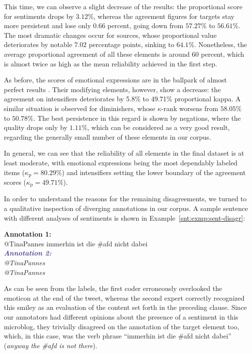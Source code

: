 This time, we can observe a slight decrease of the results: the
proportional score for sentiments drops by $3.12\%$, whereas the
agreement figures for targets stay more persistent and lose only 0.66
percent, going down from $57.27\%$ to $56.61\%$.  The most dramatic
changes occur for sources, whose proportional value deteriorates by
notable $7.02$ percentage points, sinking to $64.1\%$.  Nonetheless,
the average proportional agreement of all these elements is around 60
percent, which is almost twice as high as the mean reliability
achieved in the first step.

As before, the scores of emotional expressions are in the ballpark of
almost perfect results \cite[cf.][]{Landis:77}.  Their modifying
elements, however, show a decrease: the agreement on intensifiers
deteriorates by 5.8\% to 49.71\% proportional kappa.  A similar
situation is observed for diminishers, whose $\kappa$-rank worsens
from $58.05\%$ to $50.78\%$.  The best persistence in this regard is
shown by negations, where the quality drops only by $1.11\%$, which
can be considered as a very good result, regarding the generally small
number of these elements in our corpus.

In general, we can see that the reliability of all elements in the
final dataset is at least moderate, with emotional expressions being
the most dependably labeled items ($\kappa_{\textrm{p}}=80.29\%$) and
intensifiers setting the lower boundary of the agreement scores
($\kappa_{\textrm{p}}=49.71\%$).

In order to understand the reasons for the remaining disagreements, we
turned to a qualitative inspection of diverging annotations in our
corpus.  A sample sentence with different analyses of sentiments is
shown in Example~\ref{snt:exmp:sent-disagr}:
\begin{example}\label{snt:exmp:sent-disagr}
  \textcolor{red3}{\textbf{Annotation 1:}}\\ \upshape{}@TinaPannes
  immerhin ist die \#afd nicht dabei \smiley{}\\[0.8em]\itshape
  \noindent\textcolor{darkslateblue}{\textbf{\itshape Annotation
      2:}}\\ \upshape{}@TinaPannes
  \\[0.8em]
  \noindent\itshape{}@TinaPannes
  \upshape{}
\end{example}
As can be seen from the labels, the first coder erroneously overlooked
the emoticon \smiley{} at the end of the tweet, whereas the second
expert correctly recognized this smiley as an evaluation of the
content set forth in the preceding clause.  Since our annotators had
different opinions about the presence of a sentiment in this
microblog, they trivially disagreed on the annotation of the target
element too, which, in this case, was the verb phrase ``immerhin ist
die \#afd nicht dabei'' (\emph{anyway the \#afd is not there}).

